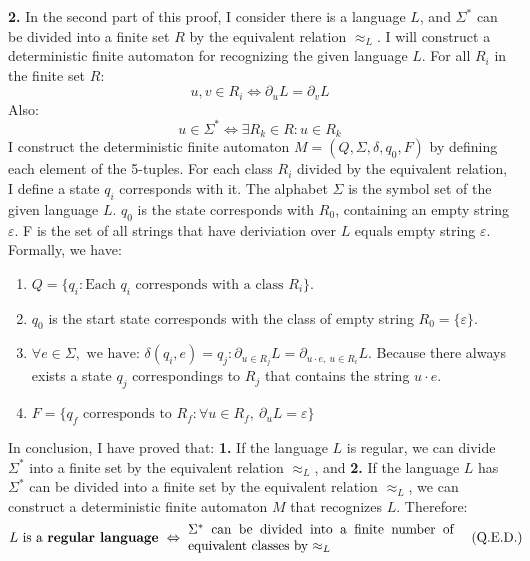 \documentclass[a4paper,12pt]{article}
\begin{document}
\vspace{1em}
\textbf{2.} In the second part of this proof, I consider there is a language $L$, and $\Sigma^{*}$ can be divided into a finite set $R$ by the equivalent relation $\approx_{L}$. I will construct a deterministic finite automaton for recognizing the given language $L$. For all $R_{i}$ in the finite set $R$:
\begin{equation*}
    u, v \in R_{i} \Leftrightarrow \partial_{u}L = \partial_{v}L
\end{equation*}
\noindent
Also:
\begin{equation*}
    u \in \Sigma^{*} \Leftrightarrow \exists R_{k} \in R : u \in R_{k}
\end{equation*}
I construct the deterministic finite automaton $M=(Q,\Sigma,\delta,q_{0},F)$ by defining each element of the 5-tuples. For each class $R_{i}$ divided by the equivalent relation, I define a state $q_{i}$ corresponds with it. The alphabet $\Sigma$ is the symbol set of the given language $L$. $q_{0}$ is the state corresponds with $R_{0}$, containing an empty string $\varepsilon$. F is the set of all strings that have deriviation over $L$ equals empty string $\varepsilon$. Formally, we have:
\begin{enumerate}
    \item $Q = \{q_{i} : \mbox{Each } q_{i} \mbox{ corresponds with a class } R_{i}\}$.
    \item $q_{0}$ is the start state corresponds with the class of empty string $R_{0} = \{\varepsilon\}$.  
    \item $\forall e \in \Sigma,\mbox{ we have: } \delta(q_{i}, e) = q_{j} : \partial_{u \in R_{j}}L = \partial_{u\cdot e,\ u \in R_{i}}L$. Because there always exists a state $q_{j}$ correspondings to $R_{j}$ that contains the string $u\cdot e$.
    \item $F = \{q_{f} \mbox{ corresponds to } R_{f} : \forall u \in R_{f},\ \partial_{u}L = \varepsilon\}$
\end{enumerate}

In conclusion, I have proved that: \textbf{1.} If the language $L$ is regular, we can divide $\Sigma^{*}$ into a finite set by the equivalent relation $\approx_{L}$, and \textbf{2.} If the language $L$ has $\Sigma^{*}$ can be divided into a finite set by the equivalent relation $\approx_{L}$, we can construct a deterministic finite automaton $M$ that recognizes $L$. Therefore:
\begin{equation*}
    L \mbox{ is a \textbf{regular language} } \Leftrightarrow \ \parbox[c]{7cm}{$\Sigma^{*}$ can be divided into a finite number of equivalent classes by $\approx_{L}$} \ \ \ \ \parbox[c]{1cm}{ (Q.E.D.)}
\end{equation*}
\end{document}
